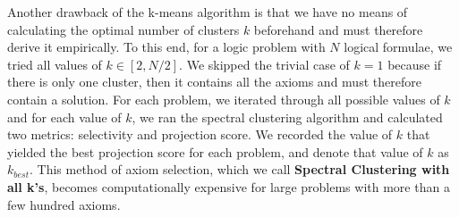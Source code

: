 \documentclass[EPiC]{easychair}
\begin{document}
Another drawback of the k-means algorithm is that we have no means of 
calculating the optimal number of clusters $k$ beforehand and must therefore 
derive it empirically. To this end, for a logic problem with $N$ logical 
formulae, we tried all values of $k \in [2, N/2]$. We skipped the trivial 
case of $k=1$ because if there is only one cluster, then it contains all the 
axioms and must therefore contain a solution. For each problem, we iterated
through all possible values of $k$ and for each value of $k$, we ran the
spectral clustering algorithm and calculated two metrics: selectivity and 
projection score. We recorded the value of $k$ that yielded the best 
projection score for each problem, and denote that value of $k$ as 
$k_{best}$. This method of axiom selection, which we call 
\textbf{Spectral Clustering with all k's}, becomes computationally 
expensive for large problems with more than a few hundred axioms.
\end{document}
